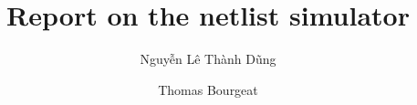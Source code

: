 \documentclass[a4paper, 11pt]{article}
\begin{document}
\title{Report on the netlist simulator}
\author{Nguy\~ên Lê Thành D\~ung \and Thomas Bourgeat}
\maketitle
\end{document}
